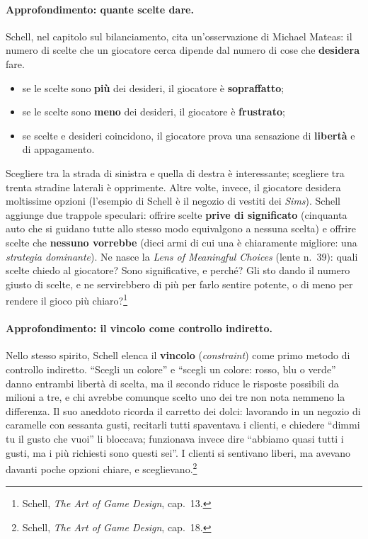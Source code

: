 \paragraph{Approfondimento: quante scelte dare.} Schell, nel capitolo sul
bilanciamento, cita un'osservazione di Michael Mateas: il numero di scelte che
un giocatore cerca dipende dal numero di cose che \textbf{desidera} fare.
\begin{itemize}
  \item se le scelte sono \textbf{più} dei desideri, il giocatore è
        \textbf{sopraffatto};
  \item se le scelte sono \textbf{meno} dei desideri, il giocatore è
        \textbf{frustrato};
  \item se scelte e desideri coincidono, il giocatore prova una sensazione
        di \textbf{libertà} e di appagamento.
\end{itemize}
Scegliere tra la strada di sinistra e quella di destra è interessante;
scegliere tra trenta stradine laterali è opprimente. Altre volte, invece, il
giocatore desidera moltissime opzioni (l'esempio di Schell è il negozio di
vestiti dei \emph{Sims}). Schell aggiunge due trappole speculari: offrire
scelte \textbf{prive di significato} (cinquanta auto che si guidano tutte
allo stesso modo equivalgono a nessuna scelta) e offrire scelte che
\textbf{nessuno vorrebbe} (dieci armi di cui una è chiaramente migliore: una
\emph{strategia dominante}). Ne nasce la \emph{Lens of Meaningful Choices}
(lente n.~39): quali scelte chiedo al giocatore? Sono significative, e
perché? Gli sto dando il numero giusto di scelte, e ne servirebbero di più
per farlo sentire potente, o di meno per rendere il gioco più
chiaro?\footnote{Schell, \emph{The Art of Game Design}, cap.~13.}

\paragraph{Approfondimento: il vincolo come controllo indiretto.} Nello
stesso spirito, Schell elenca il \textbf{vincolo} (\emph{constraint}) come
primo metodo di controllo indiretto. ``Scegli un colore'' e ``scegli un
colore: rosso, blu o verde'' danno entrambi libertà di scelta, ma il secondo
riduce le risposte possibili da milioni a tre, e chi avrebbe comunque scelto
uno dei tre non nota nemmeno la differenza. Il suo aneddoto ricorda il
carretto dei dolci: lavorando in un negozio di caramelle con sessanta gusti,
recitarli tutti spaventava i clienti, e chiedere ``dimmi tu il gusto che
vuoi'' li bloccava; funzionava invece dire ``abbiamo quasi tutti i gusti, ma
i più richiesti sono questi sei''. I clienti si sentivano liberi, ma avevano
davanti poche opzioni chiare, e sceglievano.\footnote{Schell, \emph{The Art
of Game Design}, cap.~18.}

